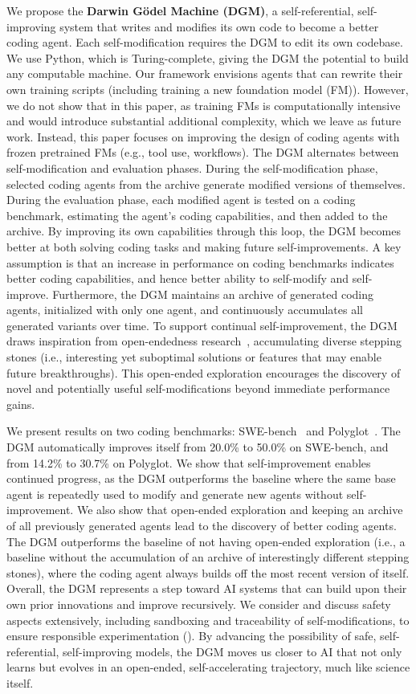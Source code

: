 We propose the \textbf{Darwin G\"odel Machine (DGM)}, a self-referential, self-improving system that writes and modifies its own code to become a better coding agent. Each self-modification requires the DGM to edit its own codebase. We use Python, which is Turing-complete, giving the DGM the potential to build any computable machine. Our framework envisions agents that can rewrite their own training scripts (including training a new foundation model (FM)). However, we do not show that in this paper, as training FMs is computationally intensive and would introduce substantial additional complexity, which we leave as future work. Instead, this paper focuses on improving the design of coding agents with frozen pretrained FMs (e.g., tool use, workflows). The DGM alternates between self-modification and evaluation phases. During the self-modification phase, selected coding agents from the archive generate modified versions of themselves. During the evaluation phase, each modified agent is tested on a coding benchmark, estimating the agent's coding capabilities, and then added to the archive. By improving its own capabilities through this loop, the DGM becomes better at both solving coding tasks and making future self-improvements. A key assumption is that an increase in performance on coding benchmarks indicates better coding capabilities, and hence better ability to self-modify and self-improve. Furthermore, the DGM maintains an archive of generated coding agents, initialized with only one agent, and continuously accumulates all generated variants over time. To support continual self-improvement, the DGM draws inspiration from open-endedness research~\citep{wang2019paired, fernandopromptbreeder, faldor2025omni}, accumulating diverse stepping stones (i.e., interesting yet suboptimal solutions or features that may enable future breakthroughs). This open-ended exploration encourages the discovery of novel and potentially useful self-modifications beyond immediate performance gains.

We present results on two coding benchmarks: SWE-bench~\citep{jimenez2024swebench} and Polyglot~\citep{gauthier2024polyglot}. The DGM automatically improves itself from 20.0\% to 50.0\% on SWE-bench, and from 14.2\% to 30.7\% on Polyglot. We show that self-improvement enables continued progress, as the DGM outperforms the baseline where the same base agent is repeatedly used to modify and generate new agents without self-improvement. We also show that open-ended exploration and keeping an archive of all previously generated agents lead to the discovery of better coding agents. The DGM outperforms the baseline of not having open-ended exploration (i.e., a baseline without the accumulation of an archive of interestingly different stepping stones), where the coding agent always builds off the most recent version of itself. Overall, the DGM represents a step toward AI systems that can build upon their own prior innovations and improve recursively. We consider and discuss safety aspects extensively, including sandboxing and traceability of self-modifications, to ensure responsible experimentation (). By advancing the possibility of safe, self-referential, self-improving models, the DGM moves us closer to AI that not only learns but evolves in an open-ended, self-accelerating trajectory, much like science itself.
